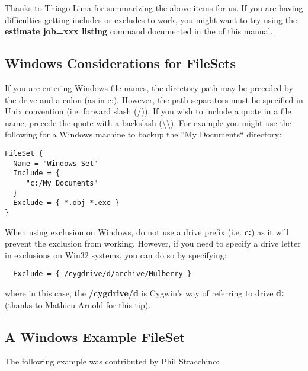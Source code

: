 Thanks to Thiago Lima for summarizing the above items for us. If you are
having difficulties getting includes or excludes to work, you might want to
try using the {\bf estimate job=xxx listing} command documented in the 
 of this manual. 
\label{win32}

\subsection*{Windows Considerations for FileSets}

If you are entering Windows file names, the directory path may be preceded by
the drive and a colon (as in c:). However, the path separators must be
specified in Unix convention (i.e. forward slash (/)). If you wish to include
a quote in a file name, precede the quote with a backslash
(\textbackslash{}\textbackslash{}). For example you might use the following
for a Windows machine to backup the ''My Documents`` directory: 

\footnotesize
\begin{verbatim}
FileSet {
  Name = "Windows Set"
  Include = {
     "c:/My Documents"
  }
  Exclude = { *.obj *.exe }
}
\end{verbatim}
\normalsize

When using exclusion on Windows, do not use a drive prefix (i.e. {\bf c:}) as
it will prevent the exclusion from working. However, if you need to specify a
drive letter in exclusions on Win32 systems, you can do so by specifying: 

\footnotesize
\begin{verbatim}
  Exclude = { /cygdrive/d/archive/Mulberry }
\end{verbatim}
\normalsize

where in this case, the {\bf /cygdrive/d} is Cygwin's way of referring to
drive {\bf d:} (thanks to Mathieu Arnold for this tip). 

\subsection*{A Windows Example FileSet}

The following example was contributed by Phil Stracchino: 

